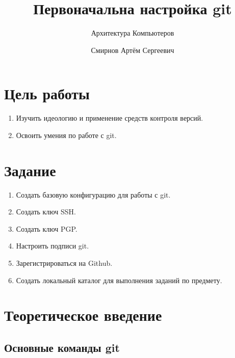 \documentclass[
  english,
  russian,
  12pt,
  a4paper,
  DIV=11,
  numbers=noendperiod]{scrreprt}
\title{Первоначальна настройка git}
\subtitle{Архитектура Компьютеров}
\author{Смирнов Артём Сергеевич}
\date{}
\providecommand{\tightlist}{%
  \setlength{\itemsep}{0pt}\setlength{\parskip}{0pt}}
\renewcommand*\contentsname{Содержание}
\newcommand\contentsname{Содержание}
\begin{document}
\maketitle

\renewcommand*\contentsname{Содержание}
{
\setcounter{tocdepth}{1}
\tableofcontents
}
\listoffigures
\listoftables

\chapter{Цель
работы}\label{ux446ux435ux43bux44c-ux440ux430ux431ux43eux442ux44b}

\begin{enumerate}
\def\labelenumi{\arabic{enumi})}
\tightlist
\item
  Изучить идеологию и применение средств контроля версий.
\item
  Освоить умения по работе с git.
\end{enumerate}

\chapter{Задание}\label{ux437ux430ux434ux430ux43dux438ux435}

\begin{enumerate}
\def\labelenumi{\arabic{enumi})}
\tightlist
\item
  Создать базовую конфигурацию для работы с git.
\item
  Создать ключ SSH.
\item
  Создать ключ PGP.
\item
  Настроить подписи git.
\item
  Зарегистрироваться на Github.
\item
  Создать локальный каталог для выполнения заданий по предмету.
\end{enumerate}

\chapter{Теоретическое
введение}\label{ux442ux435ux43eux440ux435ux442ux438ux447ux435ux441ux43aux43eux435-ux432ux432ux435ux434ux435ux43dux438ux435}

\section{Основные команды
git}\label{ux43eux441ux43dux43eux432ux43dux44bux435-ux43aux43eux43cux430ux43dux434ux44b-git}
\end{document}
